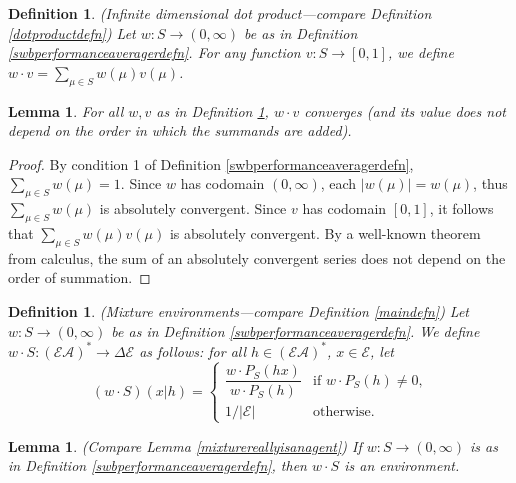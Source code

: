 \documentclass[twoside]{article}
\newtheorem{definition}[theorem]{Definition}
\newtheorem{lemma}[theorem]{Lemma}
\begin{document}
\begin{definition}
\label{infinitedimdotproductdefn}
    (Infinite dimensional dot product---compare Definition \ref{dotproductdefn})
    Let $w:S\to(0,\infty)$ be as in Definition \ref{swbperformanceaveragerdefn}.
    For any function $v:S\to[0,1]$,
    we define $w\cdot v=\sum_{\mu\in S}w(\mu)v(\mu)$.
\end{definition}

\begin{lemma}
    For all $w,v$ as in Definition \ref{infinitedimdotproductdefn},
    $w\cdot v$ converges (and its value does not depend on the order in which
    the summands are added).
\end{lemma}

\begin{proof}
    By condition 1 of Definition \ref{swbperformanceaveragerdefn},
    $\sum_{\mu\in S}w(\mu)=1$.
    Since $w$ has codomain $(0,\infty)$, each $|w(\mu)|=w(\mu)$,
    thus $\sum_{\mu\in S}w(\mu)$
    is absolutely convergent.
    Since $v$ has codomain $[0,1]$, it follows that
    $\sum_{\mu\in S}w(\mu)v(\mu)$ is absolutely convergent.
    By a well-known theorem from calculus, the sum of an absolutely
    convergent series does not depend on the order of summation.
\end{proof}

\begin{definition}
\label{mixtureenvdefn}
    (Mixture environments---compare Definition \ref{maindefn})
    Let $w:S\to(0,\infty)$ be as in Definition \ref{swbperformanceaveragerdefn}.
    We define $w\cdot S:(\mathcal E\mathcal A)^*\to\Delta\mathcal E$ as follows:
    for all $h\in (\mathcal E\mathcal A)^*$, $x\in\mathcal E$, let
    \[
        (w\cdot S)(x|h)
        =
        \begin{cases}
            \dfrac{w\cdot P_{S}(hx)}{w\cdot P_{S}(h)}
            &\mbox{if $w\cdot P_{S}(h)\not=0$,}\\
            1/|\mathcal E| &\mbox{otherwise.}
        \end{cases}
    \]
\end{definition}

\begin{lemma}
    (Compare Lemma \ref{mixturereallyisanagent})
    If $w:S\to(0,\infty)$ is as in Definition \ref{swbperformanceaveragerdefn},
    then $w\cdot S$ is an environment.
\end{lemma}
\end{document}
